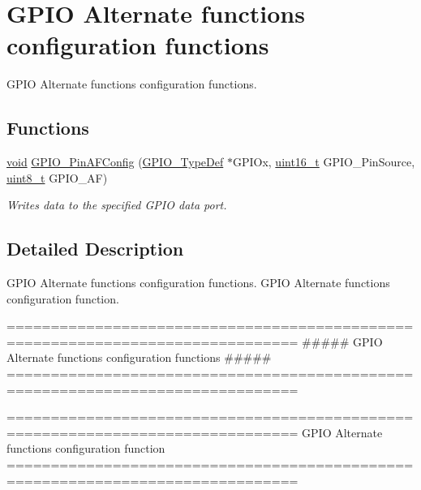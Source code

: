 \hypertarget{group___g_p_i_o___group3}{\section{G\-P\-I\-O Alternate functions configuration functions}
\label{group___g_p_i_o___group3}
}


G\-P\-I\-O Alternate functions configuration functions.  


\subsection*{Functions}
\begin{DoxyCompactItemize}
\item 
\hyperlink{group___n_a_m_e_ga18028b8badbf1ea7e704ccac3c488e82}{void} \hyperlink{group___g_p_i_o___group3_ga0a77617a322562ae84f8d72486032c5d}{G\-P\-I\-O\-\_\-\-Pin\-A\-F\-Config} (\hyperlink{struct_g_p_i_o___type_def}{G\-P\-I\-O\-\_\-\-Type\-Def} $\ast$G\-P\-I\-Ox, \hyperlink{stdint_8h_a273cf69d639a59973b6019625df33e30}{uint16\-\_\-t} G\-P\-I\-O\-\_\-\-Pin\-Source, \hyperlink{stdint_8h_aba7bc1797add20fe3efdf37ced1182c5}{uint8\-\_\-t} G\-P\-I\-O\-\_\-\-A\-F)
\begin{DoxyCompactList}\small\item\em Writes data to the specified G\-P\-I\-O data port. \end{DoxyCompactList}\end{DoxyCompactItemize}


\subsection{Detailed Description}
G\-P\-I\-O Alternate functions configuration functions. G\-P\-I\-O Alternate functions configuration function.

\begin{DoxyVerb} ===============================================================================
          ##### GPIO Alternate functions configuration functions #####
 ===============================================================================\end{DoxyVerb}


\begin{DoxyVerb} ===============================================================================
               GPIO Alternate functions configuration function
 ===============================================================================  \end{DoxyVerb}
 

